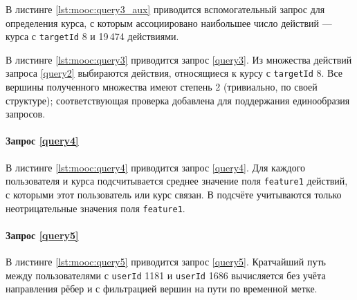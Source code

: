 В листинге \ref{lst:mooc:query3_aux} приводится вспомогательный запрос для определения курса, с которым ассоциировано
наибольшее число действий --- курса с \texttt{targetId} 8 и 19\,474 действиями.


В листинге \ref{lst:mooc:query3} приводится запрос \ref{query3}. Из множества действий запроса \ref{query2} выбираются
действия, относящиеся к курсу с \texttt{targetId} 8. Все вершины полученного множества имеют степень 2
(тривиально, по своей структуре); соответствующая проверка добавлена для поддержания единообразия запросов.


\paragraph{Запрос \ref{query4}}

В листинге \ref{lst:mooc:query4} приводится запрос \ref{query4}. Для каждого пользователя и курса подсчитывается
среднее значение поля \texttt{feature1} действий, с которыми этот пользователь или курс связан. В подсчёте учитываются
только неотрицательные значения поля \texttt{feature1}.


\paragraph{Запрос \ref{query5}}

В листинге \ref{lst:mooc:query5} приводится запрос \ref{query5}. Кратчайший путь между пользователями с
\texttt{userId} 1181 и \texttt{userId} 1686 вычисляется без учёта направления рёбер и с фильтрацией вершин на
пути по временной метке.

